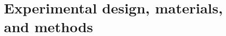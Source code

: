 \documentclass[final,3p,times,authoryear]{elsarticle}
\begin{document}
\section{Experimental design, materials, and methods}
\label{sec:create}

%
%
%
%
\end{document}
